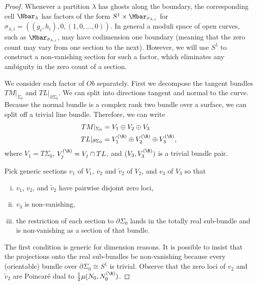 \begin{proposition}
\begin{proof}
Whenever a partition $\lambda$ has ghosts along the boundary, the corresponding cell $\Nbar_\lambda$ has factors of the form $S^1 \times \Mbar_{\sigma_{\lambda,i}}$ for $\sigma_{\lambda,i}=((g_i,h_i),0,(1,0,\ldots,0))$. In general a moduli space of open curves, such as $\Mbar_{\sigma_{\lambda,i}}$, may have codimension one boundary (meaning that the zero count may vary from one section to the next). However, we will use $S^1$ to construct a non-vanishing section for such a factor, which eliminates any ambiguity in the zero count of a section.

We consider each factor of $Ob$ separately. First we decompose the tangent bundles $TM|_{\Sigma_0}$ and $TL|_{\partial\Sigma_0}$. We can split into directions tangent and normal to the curve. Because the normal bundle is a complex rank two bundle over a surface, we can split off a trivial line bundle. Therefore, we can write
\begin{align*}
TM|_{\Sigma_0} & = V_1 \oplus V_2 \oplus V_3
\\
TL|_{\partial\Sigma_0} & = V_1^{(\R)} \oplus V_2^{(\R)} \oplus V_3^{(\R)},
\end{align*}
where $V_1=T\Sigma_0$, $V_j^{(\R)}=V_j \cap TL$, and $(V_3,V_3^{(\R)})$ is a trivial bundle pair.

Pick generic sections $v_1$ of $V_1$, $v_2$ and $\tilde{v}_2$ of $V_2$, and $v_3$ of $V_3$ so that
\begin{enumerate}[(i)]
\item $v_1$, $v_2$, and $\tilde{v}_2$ have pairwise disjoint zero loci,
\item $v_3$ is non-vanishing,
\item the restriction of each section to $\partial\Sigma_0$ lands in the totally real sub-bundle and is non-vanishing as a section of that bundle.
\end{enumerate}
The first condition is generic for dimension reasons. It is possible to insist that the projections onto the real sub-bundles be non-vanishing because every (orientable) bundle over $\partial\Sigma_0 \cong S^1$ is trivial. Observe that the zero loci of $v_2$ and $\tilde{v}_2$ are Poincar\'{e} dual to $\tfrac12\mu(N_0,N_0^{(\R)})$.


\end{proof}
\end{proposition}
